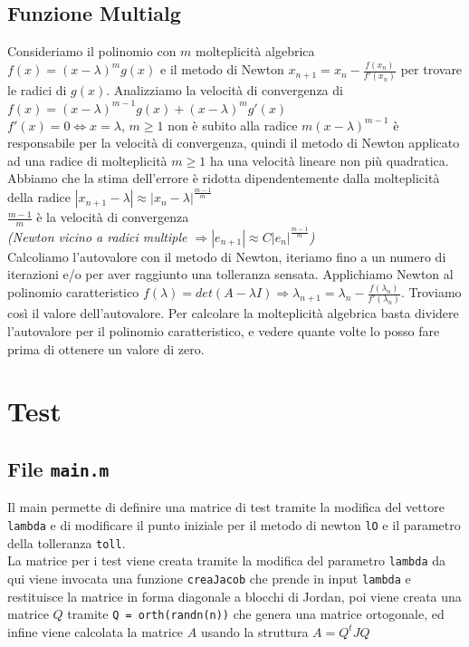 \documentclass[12pt]{article}
\begin{document}
    \subsection{Funzione Multialg}
    Consideriamo il polinomio con $m$ molteplicità algebrica $f(x)=(x-\lambda)^m g(x)$ e il metodo di Newton $x_{n+1}=x_n - \frac{f(x_n)}{f'(x_n)}$ per trovare le radici di $g(x)$.
    Analizziamo la velocità di convergenza di $f(x)=(x-\lambda)^{m-1} g(x) + (x-\lambda)^m g'(x)$\\
    $f'(x) = 0 \iff x = \lambda$, $m \geq 1$ non è subito alla radice $m(x-\lambda)^{m-1}$ è responsabile per la velocità di convergenza, quindi il metodo di Newton applicato ad una radice di molteplicità $m\geq 1$ ha una velocità lineare non più quadratica.\\
    Abbiamo che la stima dell'errore è ridotta dipendentemente dalla molteplicità della radice $|x_{n+1}-\lambda| \approx |x_n - \lambda|^{\frac{m-1}{m}}$\\
    $\frac{m-1}{m}$ è la velocità di convergenza\\ \textit{(Newton vicino a radici multiple $\Rightarrow |e_{n+1}| \approx C|e_n|^{\frac{m-1}{m}}$)}\\
    Calcoliamo l'autovalore con il metodo di Newton, iteriamo fino a un numero di iterazioni e/o per aver raggiunto una tolleranza sensata. Applichiamo Newton al polinomio caratteristico $f(\lambda) = det(A-\lambda I) \Rightarrow \lambda_{n+1} = \lambda_n - \frac{f(\lambda_n)}{f'(\lambda_n)}$. Troviamo così il valore dell'autovalore.
    Per calcolare la molteplicità algebrica basta dividere l'autovalore per il polinomio caratteristico, e vedere quante volte lo posso fare prima di ottenere un valore di zero.
    
    \section{Test}
    \subsection{File \texttt{main.m}}
    Il main permette di definire una matrice di test tramite la modifica del vettore \texttt{lambda} e  di modificare il punto iniziale per il metodo di newton \texttt{lO} e il parametro della tolleranza \texttt{toll}.\\
    La matrice per i test viene creata tramite la modifica del parametro \texttt{lambda} da qui viene invocata una funzione \texttt{creaJacob} che prende in input \texttt{lambda} e restituisce la matrice in forma diagonale a blocchi di Jordan, poi viene creata una matrice $Q$ tramite \texttt{Q = orth(randn(n))} che genera una matrice ortogonale, ed infine viene calcolata la matrice $A$ usando la struttura $A=Q^tJQ$\\
\end{document}
